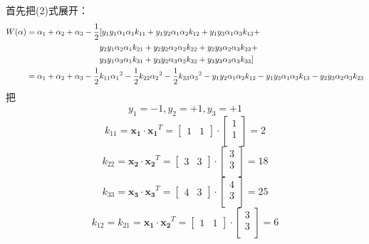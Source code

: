 \documentclass[UTF8]{ctexart}
\begin{document}
\noindent 首先把(2)式展开：
\begin{gather}\notag
    \begin{aligned}
        W(\alpha) &=\alpha_1 + \alpha_2 + \alpha_3 - \frac{1}{2}[y_1y_1\alpha_1\alpha_1k_{11} + y_1y_2\alpha_1\alpha_2k_{12}+y_1y_3\alpha_1\alpha_3k_{13}+\\
        &\quad \quad \quad \quad \quad \quad \quad \quad \quad y_2y_1\alpha_2\alpha_1k_{21} + y_2y_2\alpha_2\alpha_2k_{22} + y_2y_3\alpha_2\alpha_3k_{23} + \\
        &\quad \quad \quad \quad \quad \quad \quad \quad \quad y_3y_1\alpha_3\alpha_1k_{31} + y_3y_2\alpha_3\alpha_2k_{32} + y_3y_3\alpha_3\alpha_3k_{33}]\\
        &=\alpha_1 + \alpha_2 + \alpha_3 - \frac{1}{2}k_{11}{\alpha_1}^2 - \frac{1}{2}k_{22}{\alpha_2}^2 - \frac{1}{2}k_{33}{\alpha_3}^2 -y_1y_2\alpha_1\alpha_2k_{12} - y_1y_3\alpha_1\alpha_3k_{13} - y_2y_3\alpha_2\alpha_3k_{23}
    \end{aligned}
\end{gather}
把
$$y_1=-1,y_2=+1,y_3=+1$$
$$k_{11}=\boldsymbol {x_1} \cdot \boldsymbol {x_1}^T=
\begin{bmatrix}
    1 & 1
\end{bmatrix}
\cdot
\begin{bmatrix}
    1 \\
    1 \\
\end{bmatrix}
=2$$
$$k_{22}=\boldsymbol {x_2} \cdot \boldsymbol {x_2}^T=
\begin{bmatrix}
    3 & 3
\end{bmatrix}
\cdot
\begin{bmatrix}
    3 \\
    3 \\
\end{bmatrix}
=18$$
$$k_{33}=\boldsymbol {x_3} \cdot \boldsymbol {x_3}^T=
\begin{bmatrix}
    4 & 3
\end{bmatrix}
\cdot
\begin{bmatrix}
    4 \\
    3 \\
\end{bmatrix}
=25$$
$$k_{12}=k_{21}= \boldsymbol {x_1} \cdot \boldsymbol {x_2}^T=
\begin{bmatrix}
    1 & 1
\end{bmatrix}
\cdot
\begin{bmatrix}
    3 \\
    3 \\
\end{bmatrix}
=6$$
\end{document}
